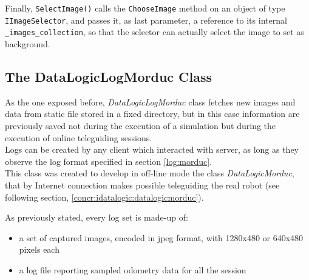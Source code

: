 Finally, \texttt{SelectImage()} calls the \texttt{ChooseImage} method 
on an object of type \texttt{IImageSelector}, and passes it, as last 
parameter, a reference to its internal \texttt{\_images\_collection}, 
so that the selector can actually select the image to set as 
background.


\subsection{The DataLogicLogMorduc Class}
\label{concr:idatalogic:datalogiclogmorduc}

As the one exposed before, \textit{DataLogicLogMorduc} class
fetches new images and data from static file
stored in a fixed directory, but in this case information are previously saved
not during the execution of a simulation but during
the execution of online teleguiding sessions.
\\
Logs can be created by any client which interacted with \morduc{}
server, as long as they observe the log format specified in section
\ref{log:morduc}.
\\
This class was created to develop in off-line mode the class
\textit{DataLogicMorduc}, that by Internet connection makes possible
teleguiding the real robot (see following section,
\ref{concr:idatalogic:datalogicmorduc}).

As previously stated, every log set is made-up of:

\begin{itemize}
  \item a set of captured images, encoded in jpeg format,
    with 1280x480 or 640x480 pixels each
  \item a log file reporting sampled odometry data
    for all the session
\end{itemize}

